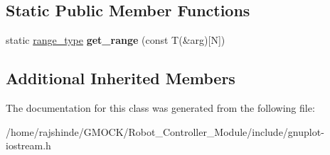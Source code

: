 \subsection*{Static Public Member Functions}
\begin{DoxyCompactItemize}
\item 
static \hyperlink{classgnuplotio_1_1_iterator_range}{range\+\_\+type} {\bfseries get\+\_\+range} (const T(\&arg)\mbox{[}N\mbox{]})\hypertarget{classgnuplotio_1_1_array_traits_3_01_t[_n]_4_adc9c1ce6da4923418f367e08c150a928}{}\label{classgnuplotio_1_1_array_traits_3_01_t[_n]_4_adc9c1ce6da4923418f367e08c150a928}

\end{DoxyCompactItemize}
\subsection*{Additional Inherited Members}


The documentation for this class was generated from the following file\+:\begin{DoxyCompactItemize}
\item 
/home/rajshinde/\+G\+M\+O\+C\+K/\+Robot\+\_\+\+Controller\+\_\+\+Module/include/gnuplot-\/iostream.\+h\end{DoxyCompactItemize}

